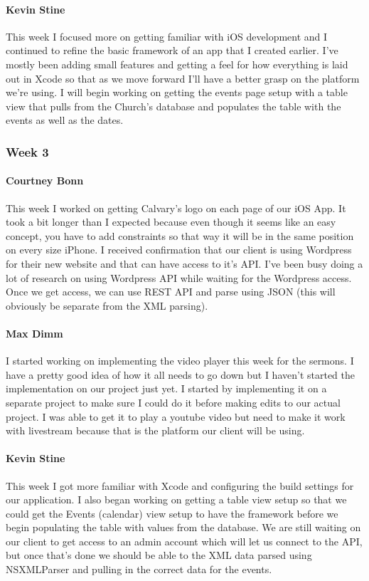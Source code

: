 			\paragraph{Kevin Stine}
			This week I focused more on getting familiar with iOS development and I continued to refine the basic framework of an app that I created earlier. I've mostly been adding small features and getting a feel for how everything is laid out in Xcode so that as we move forward I'll have a better grasp on the platform we're using. I will begin working on getting the events page setup with a table view that pulls from the Church's database and populates the table with the events as well as the dates.


		\subsubsection{Week 3}

			\paragraph{Courtney Bonn}
			This week I worked on getting Calvary's logo on each page of our iOS App. It took a bit longer than I expected because even though it seems like an easy concept, you have to add constraints so that way it will be in the same position on every size iPhone. I received confirmation that our client is using Wordpress for their new website and that can have access to it's API. I've been busy doing a lot of research on using Wordpress API while waiting for the Wordpress access. Once we get access, we can use REST API and parse using JSON (this will obviously be separate from the XML parsing).

			\paragraph{Max Dimm}
			I started working on implementing the video player this week for the sermons. I have a pretty good idea of how it all needs to go down but I haven't started the implementation on our project just yet. I started by implementing it on a separate project to make sure I could do it before making edits to our actual project. I was able to get it to play a youtube video but need to make it work with livestream because that is the platform our client will be using.

			\paragraph{Kevin Stine}
			This week I got more familiar with Xcode and configuring the build settings for our application. I also began working on getting a table view setup so that we could get the Events (calendar) view setup to have the framework before we begin populating the table with values from the database. We are still waiting on our client to get access to an admin account which will let us connect to the API, but once that's done we should be able to the XML data parsed using NSXMLParser and pulling in the correct data for the events.



